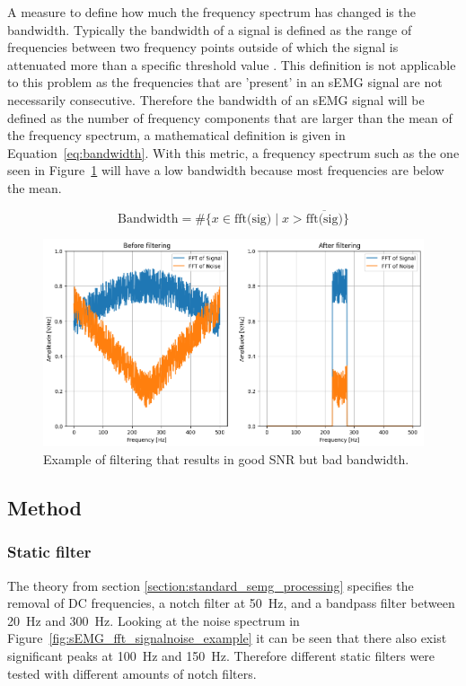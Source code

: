 A measure to define how much the frequency spectrum has changed is the bandwidth. Typically the bandwidth of a signal is defined as the range of frequencies between two frequency points outside of which the signal is attenuated more than a specific threshold value \cite{bandwidth_definition}. This definition is not applicable to this problem as the frequencies that are 'present' in an sEMG signal are not necessarily consecutive. Therefore the bandwidth of an sEMG signal will be defined as the number of frequency components that are larger than the mean of the frequency spectrum, a mathematical definition is given in Equation~\ref{eq:bandwidth}. With this metric, a frequency spectrum such as the one seen in Figure~\ref{fig:good_snr_bad_integrity} will have a low bandwidth because most frequencies are below the mean.

\begin{equation}\label{eq:bandwidth}
    \text{Bandwidth} = \# \{x\in \text{fft(sig)} \mid x> \overline{\text{fft(sig)}}\} 
\end{equation}

\begin{figure}[h!t]
	\begin{center}
		\includegraphics[width=1.0\columnwidth]{images/good_snr_bad_integrity.png}
	\end{center}
	\caption{Example of filtering that results in good SNR but bad bandwidth.}
	\label{fig:good_snr_bad_integrity}
\end{figure}


\subsection{Method}
\subsubsection{Static filter}
The theory from section \ref{section:standard_semg_processing} specifies the removal of DC frequencies, a notch filter at \SI{50}{Hz}, and a bandpass filter between \SI{20}{Hz} and \SI{300}{Hz}. Looking at the noise spectrum in Figure~\ref{fig:sEMG_fft_signalnoise_example} it can be seen that there also exist significant peaks at \SI{100}{Hz} and \SI{150}{Hz}. Therefore different static filters were tested with different amounts of notch filters. 

